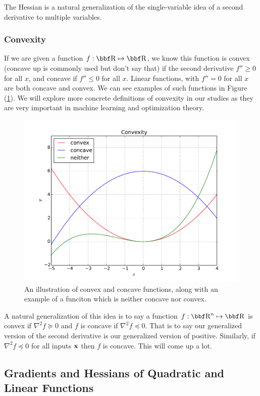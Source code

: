 \documentclass{article}
\begin{document}
The Hessian is a natural generalization of the single-variable idea of a second derivative to
multiple variables.

\subsubsection{Convexity}

If we are given a function $f : \RR \mapsto \RR$, we know this function is convex (concave up is
commonly used but don't say that) if the second derivative $f'' \geq 0$ for all $x$, and concave if
$f'' \leq 0$ for all $x$. Linear functions, with $f''=0$ for all $x$ are both concave and convex.
We can see examples of such functions in Figure (\ref{fig:convex}). We will explore more concrete
definitions of convexity in our studies as they are very important in machine learning and
optimization theory.\\

\begin{figure}[htpb]
    \centering
    \includegraphics[width=0.8\linewidth]{fig/convexity.pdf}
    \caption{An illustration of convex and concave functions, along with
    an example of a funciton which is neither concave nor convex.}
    \label{fig:convex}
\end{figure}

A natural generalization of this idea is to say a function $f : \RR^n \mapsto \RR$ is
convex if $\nabla^2 f \succeq 0$ and $f$ is concave if $\nabla^2 f \preceq 0$. That is
to say our generalized version of the second derivative is our generalized version of
positive. Similarly, if $\nabla^2 f \preceq 0$ for all inputs ${\bf x}$ then $f$ is concave.
This will come up a lot.

\subsection{Gradients and Hessians of Quadratic and Linear Functions}
\end{document}
